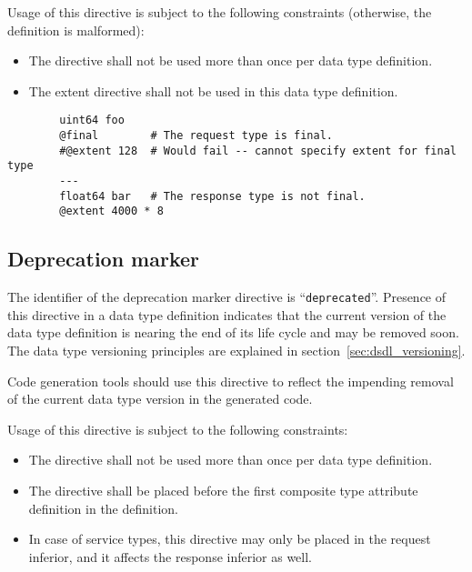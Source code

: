 Usage of this directive is subject to the following constraints (otherwise, the definition is malformed):
\begin{itemize}
    \item The directive shall not be used more than once per data type definition.
    \item The extent directive shall not be used in this data type definition.
\end{itemize}

\begin{remark}
    \begin{verbatim}
        uint64 foo
        @final        # The request type is final.
        #@extent 128  # Would fail -- cannot specify extent for final type
        ---
        float64 bar   # The response type is not final.
        @extent 4000 * 8
    \end{verbatim}
\end{remark}

\subsection{Deprecation marker}

The identifier of the deprecation marker directive is ``\verb|deprecated|''.
Presence of this directive in a data type definition indicates that the current version of the data type definition
is nearing the end of its life cycle and may be removed soon.
The data type versioning principles are explained in section~\ref{sec:dsdl_versioning}.

Code generation tools should use this directive to reflect the impending removal of the current data type version
in the generated code.

Usage of this directive is subject to the following constraints:
\begin{itemize}
    \item The directive shall not be used more than once per data type definition.
    \item The directive shall be placed before the first composite type attribute definition in the definition.
    \item In case of service types, this directive may only be placed in the request inferior,
    and it affects the response inferior as well.
\end{itemize}

